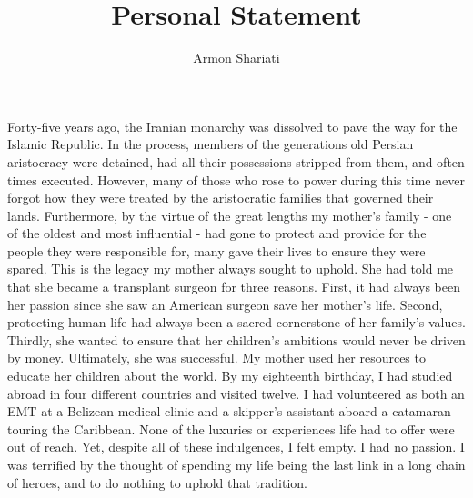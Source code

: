 \documentclass{article}
\begin{document}
\author{Armon Shariati}
\title{Personal Statement}
\date{}
\maketitle

Forty-five years ago, the Iranian monarchy was dissolved to pave the way for
the Islamic Republic. In the process, members of the generations old Persian
aristocracy were detained, had all their possessions stripped from them, and
often times executed. However, many of those who rose to power during this time
never forgot how they were treated by the aristocratic families that governed
their lands. Furthermore, by the virtue of the great lengths my mother's family
- one of the oldest and most influential - had gone to protect and provide for
the people they were responsible for, many gave their lives to ensure they were
spared. This is the legacy my mother always sought to uphold. She had told me
that she became a transplant surgeon for three reasons. First, it had always
been her passion since she saw an American surgeon save her mother's life.
Second, protecting human life had always been a sacred cornerstone of her
family's values. Thirdly, she wanted to ensure that her children's ambitions
would never be driven by money. Ultimately, she was successful. My mother used
her resources to educate her children about the world.  By my eighteenth
birthday, I had studied abroad in four different countries and visited twelve.
I had volunteered as both an EMT at a Belizean medical clinic and a skipper's
assistant aboard a catamaran touring the Caribbean.  None of the luxuries or
experiences life had to offer were out of reach. Yet, despite all of these
indulgences, I felt empty. I had no passion.  I was terrified by the thought of
spending my life being the last link in a long chain of heroes, and to do
nothing to uphold that tradition.
\end{document}
